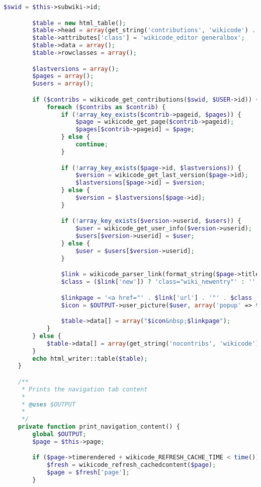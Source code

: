 \begin{lstlisting}[language=PHP]
        $swid = $this->subwiki->id;

        $table = new html_table();
        $table->head = array(get_string('contributions', 'wikicode') . $OUTPUT->help_icon('contributions', 'wikicode'));
        $table->attributes['class'] = 'wikicode_editor generalbox';
        $table->data = array();
        $table->rowclasses = array();

        $lastversions = array();
        $pages = array();
        $users = array();

        if ($contribs = wikicode_get_contributions($swid, $USER->id)) {
            foreach ($contribs as $contrib) {
                if (!array_key_exists($contrib->pageid, $pages)) {
                    $page = wikicode_get_page($contrib->pageid);
                    $pages[$contrib->pageid] = $page;
                } else {
                    continue;
                }

                if (!array_key_exists($page->id, $lastversions)) {
                    $version = wikicode_get_last_version($page->id);
                    $lastversions[$page->id] = $version;
                } else {
                    $version = $lastversions[$page->id];
                }

                if (!array_key_exists($version->userid, $users)) {
                    $user = wikicode_get_user_info($version->userid);
                    $users[$version->userid] = $user;
                } else {
                    $user = $users[$version->userid];
                }

                $link = wikicode_parser_link(format_string($page->title), array('swid' => $swid));
                $class = ($link['new']) ? 'class="wiki_newentry"' : '';

                $linkpage = '<a href="' . $link['url'] . '"' . $class . '>' . $link['content'] . '</a>';
                $icon = $OUTPUT->user_picture($user, array('popup' => true));

                $table->data[] = array("$icon&nbsp;$linkpage");
            }
        } else {
            $table->data[] = array(get_string('nocontribs', 'wikicode'));
        }
        echo html_writer::table($table);
    }

    /**
     * Prints the navigation tab content
     *
     * @uses $OUTPUT
     *
     */
    private function print_navigation_content() {
        global $OUTPUT;
        $page = $this->page;

        if ($page->timerendered + wikicode_REFRESH_CACHE_TIME < time()) {
            $fresh = wikicode_refresh_cachedcontent($page);
            $page = $fresh['page'];
        }


\end{lstlisting}

